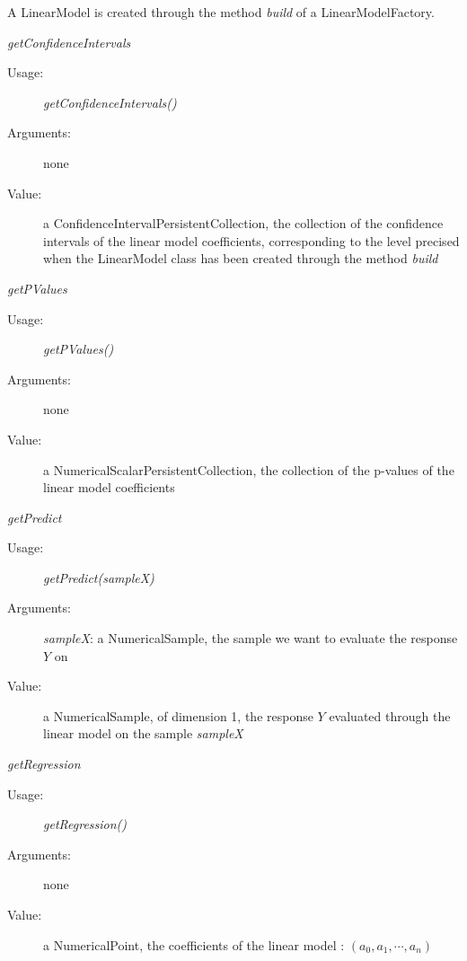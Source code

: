 \begin{description}
\item[Usage:] A LinearModel is created through the method \textit{build} of a LinearModelFactory.
\item[Some methods :]  \rule{0pt}{1em}

\begin{description}

\item \textit{getConfidenceIntervals}
\begin{description}
\item[Usage:] \textit{getConfidenceIntervals()}
\item[Arguments:] none
\item[Value:] a ConfidenceIntervalPersistentCollection, the collection  of the confidence intervals of the linear model coefficients, corresponding to the level precised when the LinearModel class has been created through the method \textit{build}

\end{description}
\bigskip

\item \textit{getPValues}
\begin{description}
\item[Usage:] \textit{getPValues()}
\item[Arguments:] none
\item[Value:] a NumericalScalarPersistentCollection, the collection  of the p-values of the linear model coefficients
\end{description}
\bigskip

\item \textit{getPredict}
\begin{description}
\item[Usage:] \textit{getPredict(sampleX)}
\item[Arguments:] \textit{sampleX}: a NumericalSample, the sample we want to evaluate the response $Y$ on
\item[Value:] a NumericalSample, of dimension 1, the response $Y$ evaluated through the linear model on the sample \textit{sampleX}
\end{description}
\bigskip

\item \textit{getRegression}
\begin{description}
\item[Usage:] \textit{getRegression()}
\item[Arguments:] none
\item[Value:] a NumericalPoint, the coefficients of the linear model : $(a_0, a_1, \cdots, a_n)$
\end{description}
\bigskip


\end{description}
\end{description}

